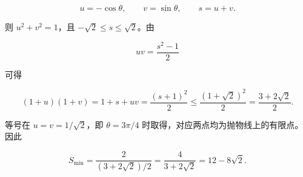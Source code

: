 \begin{answer}
\nopagebreak[4]
\[
u=-\cos\theta,\qquad v=\sin\theta,\qquad s=u+v.
\]

则 $u^2+v^2=1$，且 $-\sqrt2\leqslant s\leqslant\sqrt2$。由

\nopagebreak[4]
\[
uv=\frac{s^2-1}{2}
\]

可得

\nopagebreak[4]
\[
(1+u)(1+v)
=1+s+uv
=\frac{(s+1)^2}{2}
\leqslant\frac{(1+\sqrt2)^2}{2}
=\frac{3+2\sqrt2}{2}.
\]

等号在 $u=v=1/\sqrt2$，即 $\theta=3\pi/4$ 时取得，对应两点均为抛物线上的有限点。因此

\nopagebreak[4]
\[
S_{\min}
=\frac{2}{(3+2\sqrt2)/2}
=\frac4{3+2\sqrt2}
=12-8\sqrt2.
\]



\end{answer}

